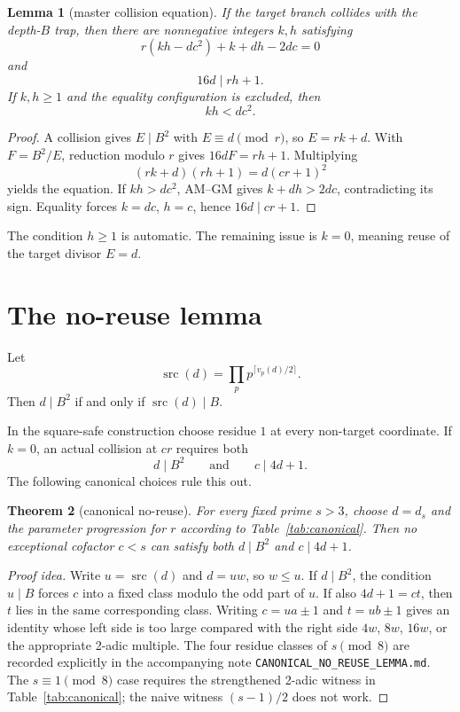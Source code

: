 \documentclass[11pt]{article}
\newtheorem{theorem}{Theorem}
\newtheorem{lemma}[theorem]{Lemma}
\theoremstyle{definition}
\newcommand{\src}{\operatorname{src}}
\begin{document}
\begin{lemma}[master collision equation]\label{lem:master}
If the target branch collides with the depth-$B$ trap, then there are nonnegative integers $k,h$ satisfying
\[
\boxed{r(kh-dc^2)+k+dh-2dc=0}
\]
and
\[
16d\mid rh+1.
\]
If $k,h\ge1$ and the equality configuration is excluded, then
\[
\boxed{kh<dc^2.}
\]
\end{lemma}

\begin{proof}
A collision gives $E\mid B^2$ with $E\equiv d\pmod r$, so $E=rk+d$. With $F=B^2/E$, reduction modulo $r$ gives $16dF=rh+1$. Multiplying
\[
(rk+d)(rh+1)=d(cr+1)^2
\]
yields the equation. If $kh>dc^2$, AM--GM gives $k+dh>2dc$, contradicting its sign. Equality forces $k=dc$, $h=c$, hence $16d\mid cr+1$.
\end{proof}

The condition $h\ge1$ is automatic. The remaining issue is $k=0$, meaning reuse of the target divisor $E=d$.

\section{The no-reuse lemma}
Let
\[
\src(d)=\prod_p p^{\lceil v_p(d)/2\rceil}.
\]
Then $d\mid B^2$ if and only if $\src(d)\mid B$.

In the square-safe construction choose residue $1$ at every non-target coordinate. If $k=0$, an actual collision at $cr$ requires both
\[
\boxed{d\mid B^2}
\qquad\text{and}\qquad
\boxed{c\mid4d+1.}
\]
The following canonical choices rule this out.

\begin{theorem}[canonical no-reuse]\label{thm:noreuse}
For every fixed prime $s>3$, choose $d=d_s$ and the parameter progression for $r$ according to Table~\ref{tab:canonical}. Then no exceptional cofactor $c<s$ can satisfy both $d\mid B^2$ and $c\mid4d+1$.
\end{theorem}

\begin{proof}[Proof idea]
Write $u=\src(d)$ and $d=uw$, so $w\le u$. If $d\mid B^2$, the condition $u\mid B$ forces $c$ into a fixed class modulo the odd part of $u$. If also $4d+1=ct$, then $t$ lies in the same corresponding class. Writing $c=ua\pm1$ and $t=ub\pm1$ gives an identity whose left side is too large compared with the right side $4w$, $8w$, $16w$, or the appropriate 2-adic multiple. The four residue classes of $s\pmod8$ are recorded explicitly in the accompanying note \texttt{CANONICAL\_NO\_REUSE\_LEMMA.md}. The $s\equiv1\pmod8$ case requires the strengthened 2-adic witness in Table~\ref{tab:canonical}; the naive witness $(s-1)/2$ does not work.
\end{proof}
\end{document}
